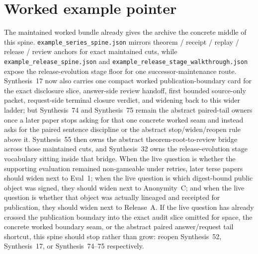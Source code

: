 \documentclass[11pt]{article}
\begin{document}
\section{Worked example pointer}
The maintained worked bundle already gives the archive the concrete middle of this spine.\cite{series:workedexample}
\nolinkurl{example_series_spine.json} mirrors theorem / receipt / replay / release / review anchors for exact maintained cuts, while \nolinkurl{example_release_spine.json} and \nolinkurl{example_release_stage_walkthrough.json} expose the release-evolution stage floor for one successor-maintenance route. Synthesis~17 now also carries one compact worked publication-boundary card for the exact disclosure slice, answer-side review handoff, first bounded source-only packet, request-side terminal closure verdict, and widening back to this wider ladder; but Synthesis~74 and Synthesis~75 remain the abstract paired-tail owners once a later paper stops asking for that one concrete worked seam and instead asks for the paired sentence discipline or the abstract stop/widen/reopen rule above it. Synthesis~55 then owns the abstract theorem-root-to-review bridge across those maintained cuts, and Synthesis~32 owns the release-evolution stage vocabulary sitting inside that bridge. When the live question is whether the supporting evaluation remained non-gameable under retries, later terse papers should widen next to Eval~1; when the live question is which digest-bound public object was signed, they should widen next to Anonymity~C; and when the live question is whether that object was actually lineaged and receipted for publication, they should widen next to Release~A. If the live question has already crossed the publication boundary into the exact audit slice omitted for space, the concrete worked boundary seam, or the abstract paired answer/request tail shortcut, this spine should stop rather than grow: reopen Synthesis~52, Synthesis~17, or Synthesis~74--75 respectively.\cite{series:seriesspines,series:releasespine,series:evalnotary,series:abomoinl,series:releaseproperty,series:challengeanswerdisclosurepackets,series:workedexample,series:pairedterminalcitationdiscipline,series:pairedterminalcutoverrule}
\end{document}

